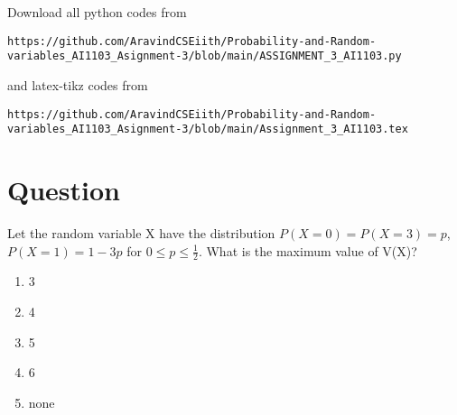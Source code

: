 \documentclass[journal,12pt,twocolumn]{IEEEtran}
\begin{document}
\maketitle
\newpage
\bigskip
\renewcommand{\thefigure}{\theenumi}
\renewcommand{\thetable}{\theenumi}
Download all python codes from 
%
\begin{lstlisting}
https://github.com/AravindCSEiith/Probability-and-Random-variables_AI1103_Asignment-3/blob/main/ASSIGNMENT_3_AI1103.py
\end{lstlisting}
and latex-tikz codes from
%
\begin{lstlisting}
https://github.com/AravindCSEiith/Probability-and-Random-variables_AI1103_Asignment-3/blob/main/Assignment_3_AI1103.tex
\end{lstlisting}
\section*{Question}
Let the random variable X have the distribution $P(X=0)=P(X=3)=p$, $P(X=1)=1-3p$ for $0{\leq}p{\leq}\frac{1}{2}$. What is the maximum value of V(X)?
\begin{enumerate}[label=\Alph*)]
    \item 3
    \item 4
    \item 5
    \item 6
    \item none
\end{enumerate}
\end{document}
